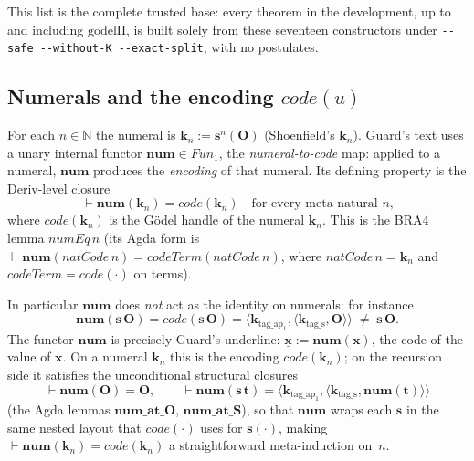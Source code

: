 \documentclass[11pt]{article}
\theoremstyle{plain}
\theoremstyle{definition}
\theoremstyle{remark}
\newcommand{\code}[1]{\mathit{code}(#1)}
\newcommand{\num}{\mathbf{num}}
\newcommand{\seq}[1]{\langle #1 \rangle}
\newcommand{\Fun}{\mathit{Fun}}
\begin{document}
This list is the complete trusted base: every theorem in the
development, up to and including $\mathrm{godelII}$, is built solely from
these seventeen constructors under \texttt{-{}-safe -{}-without-K -{}-exact-split},
with no postulates.

\subsection{Numerals and the encoding $\code{u}$}

For each $n \in \mathbb{N}$ the numeral is
$\mathbf{k}_n := \mathbf{s}^n(\mathbf{O})$ (Shoenfield's
$\mathbf{k}_n$).  Guard's text uses a unary internal functor
$\num \in \Fun_1$, the \emph{numeral-to-code} map: applied to a
numeral, $\num$ produces the \emph{encoding} of that numeral.  Its
defining property is the Deriv-level closure
\[
\vdash \num(\mathbf{k}_n) = \code{\mathbf{k}_n}
\quad\text{for every meta-natural $n$,}
\]
where $\code{\mathbf{k}_n}$ is the G\"odel handle of the numeral
$\mathbf{k}_n$.  This is the BRA4 lemma $\mathit{numEq}\,n$ (its Agda
form is $\vdash \num(\mathit{natCode}\,n) = \mathit{codeTerm}(\mathit{natCode}\,n)$,
where $\mathit{natCode}\,n = \mathbf{k}_n$ and
$\mathit{codeTerm} = \code{\cdot}$ on terms).

In particular $\num$ does \emph{not} act as the identity on numerals:
for instance
\[
\num(\mathbf{s}\,\mathbf{O}) = \code{\mathbf{s}\,\mathbf{O}} = \seq{\mathbf{k}_{\mathrm{tag\_ap_1}}, \seq{\mathbf{k}_{\mathrm{tag\_s}}, \mathbf{O}}} \;\neq\; \mathbf{s}\,\mathbf{O}.
\]
The functor $\num$ is precisely Guard's underline:
$\underline{\mathbf{x}} := \num(\mathbf{x})$, the code of the value of
$\mathbf{x}$.  On a numeral $\mathbf{k}_n$ this is the encoding
$\code{\mathbf{k}_n}$; on the recursion side it satisfies the
unconditional structural closures
\[
\vdash \num(\mathbf{O}) = \mathbf{O}, \qquad
\vdash \num(\mathbf{s}\,\mathbf{t}) = \seq{\mathbf{k}_{\mathrm{tag\_ap_1}}, \seq{\mathbf{k}_{\mathrm{tag\_s}}, \num(\mathbf{t})}}
\]
(the Agda lemmas $\mathbf{num\_at\_O}$, $\mathbf{num\_at\_S}$), so that
$\num$ wraps each $\mathbf{s}$ in the same nested layout that
$\code{\cdot}$ uses for $\mathbf{s}(\cdot)$, making
$\vdash \num(\mathbf{k}_n) = \code{\mathbf{k}_n}$ a straightforward
meta-induction on~$n$.
\end{document}
